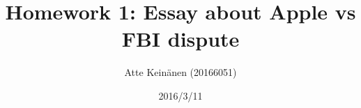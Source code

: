 \documentclass[twoside]{article}
\title{Homework 1: Essay about Apple vs FBI dispute}
\subtitle{} %
\author{Atte Keinänen (20166051)}
\date{2016/3/11}
\begin{document}
\maketitle{}

\cite{notsoshort}

\printbibliography
\end{document}
